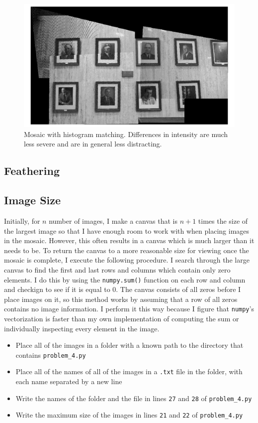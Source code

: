 \documentclass[]{article}
\begin{document}
	\begin{figure}[H]
		\centering
		\includegraphics[width=6.5in]{test_images/hist_match.png}
		\caption{Mosaic with histogram matching. Differences in intensity are much less severe and are in general less distracting.}
	\end{figure}
	
	\subsection{Feathering}
	\subsection{Image Size}
	Initially, for $n$ number of images, I make a canvas that is $n+1$ times the size of the largest image so that I have enough room to work with when placing images in the mosaic. However, this often results in a canvas which is much larger than it needs to be. To return the canvas to a more reasonable size for viewing once the mosaic is complete, I execute the following procedure. I search through the large canvas to find the first and last rows and columns which contain only zero elements. I do this by using the \texttt{numpy.sum()} function on each row and column and checkign to see if it is equal to 0. The canvas consists of all zeros before I place images on it, so this method works by assuming that a row of all zeros contains no image information. I perform it this way because I figure that \texttt{numpy}'s vectorization is faster than my own implementation of computing the sum or individually inspecting every element in the image. 
	\begin{itemize}
	\item Place all of the images in a folder with a known path to the directory that contains \texttt{problem\_4.py}
	\item Place all of the names of all of the images in a \texttt{.txt} file in the folder, with each name separated by a new line
	\item Write the names of the folder and the file in lines \texttt{27} and \texttt{28} of \texttt{problem\_4.py}
	\item Write the maximum size of the images in lines \texttt{21} and \texttt{22} of \texttt{problem\_4.py}
	
\end{itemize}
\end{document}
